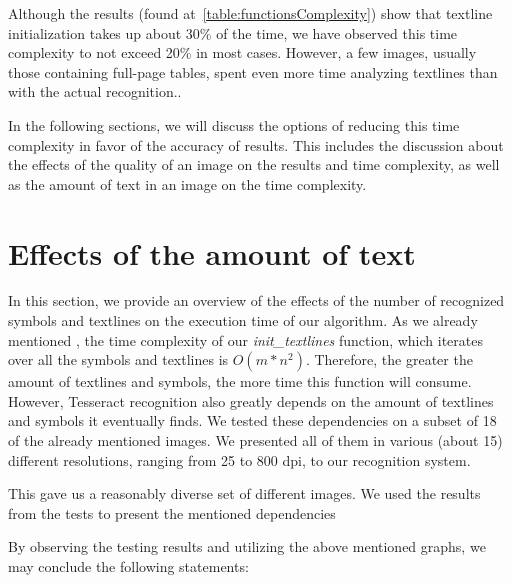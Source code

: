 Although the results (found at~\cref{table:functionsComplexity}) show that textline initialization takes up about 30\% of the time, we have observed this time complexity to not exceed 20\% in most cases. However, a few images, usually those containing full-page tables, spent even more time analyzing textlines than with the actual recognition..

In the following sections, we will discuss the options of reducing this time complexity in favor of the accuracy of results. This includes the discussion about the effects of the quality of an image on the results and time complexity, as well as the amount of text in an image on the time complexity.

\section{Effects of the amount of text} \label{resultsEffectsOfText}

In this section, we provide an overview of the effects of the number of recognized symbols and textlines on the execution time of our algorithm. As we already mentioned , the time complexity of our \emph{init\_textlines} function, which iterates over all the symbols and textlines is $O(m*n^2)$. Therefore, the greater the amount of textlines and symbols, the more time this function will consume. However, Tesseract recognition also greatly depends on the amount of textlines and symbols it eventually finds. We tested these dependencies on a subset of 18 of the already mentioned images. We presented all of them in various (about 15) different resolutions, ranging from 25 to 800 dpi, to our recognition system. 

This gave us a reasonably diverse set of different images. We used the results from the tests to present the mentioned dependencies 

By observing the testing results and utilizing the above mentioned graphs, we may conclude the following statements:

